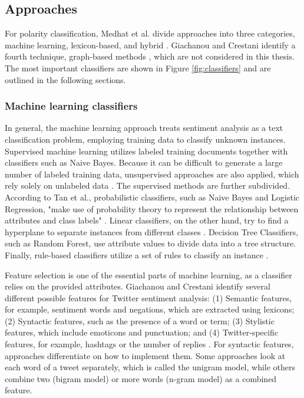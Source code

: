 \subsection{Approaches}
For polarity classification, Medhat et al. divide approaches into three categories, machine learning, lexicon-based, and hybrid \cite{MEDHAT20141093}. Giachanou and Crestani identify a fourth technique, graph-based methods \cite{DBLP:journals/csur/GiachanouC16}, which are not considered in this thesis. The most important classifiers are shown in Figure \ref{fig:classifiers} and are outlined in the following sections. 

\subsubsection{Machine learning classifiers}
\label{sub:fund_mach}
In general, the machine learning approach treats sentiment analysis as a text classification problem, employing training data to classify unknown instances. Supervised machine learning utilizes labeled training documents together with classifiers such as Naive Bayes. Because it can be difficult to generate a large number of labeled training data, unsupervised approaches are also applied, which rely solely on unlabeled data \cite{MEDHAT20141093}. The supervised methods are further subdivided. According to Tan et al., probabilistic classifiers, such as Naive Bayes and Logistic Regression, "make use of probability theory to represent the relationship between attributes and class labels" \cite[p.~414]{DBLP:books/aw/TanSKK2019}. Linear classifiers, on the other hand, try to find a hyperplane to separate instances from different classes \cite{MEDHAT20141093}. Decision Tree Classifiers, such as Random Forest, use attribute values to divide data into a tree structure. Finally, rule-based classifiers utilize a set of rules to classify an instance \cite{DBLP:books/aw/TanSKK2019}.

Feature selection is one of the essential parts of machine learning, as a classifier relies on the provided attributes. Giachanou and Crestani identify several different possible features for Twitter sentiment analysis: (1) Semantic features, for example, sentiment words and negations, which are extracted using lexicons; (2) Syntactic features, such as the presence of a word or term; (3) Stylistic features, which include emoticons and punctuation; and (4) Twitter-specific features, for example, hashtags or the number of replies \cite{DBLP:journals/csur/GiachanouC16}. For syntactic features, approaches differentiate on how to implement them. Some approaches look at each word of a tweet separately, which is called the unigram model, while others combine two (bigram model) or more words (n-gram model) as a combined feature.

